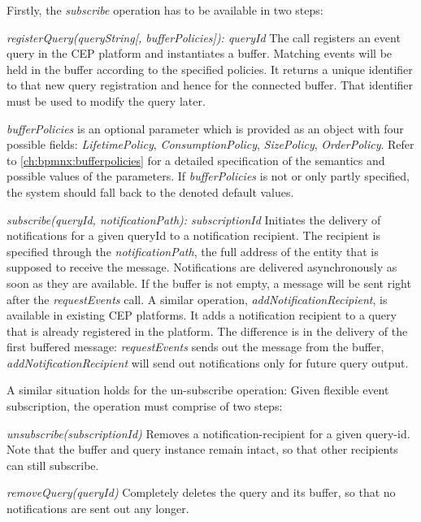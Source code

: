 Firstly, the \textit{subscribe} operation has to be available in two steps:

\begin{aenumerate}
	\item \textit{registerQuery(queryString[, bufferPolicies]): queryId}\newline
	The call registers an event query in the CEP platform and instantiates a buffer. Matching events will be held in the buffer according to the specified  policies. It returns a unique identifier to that new query registration and hence for the connected buffer. That identifier must be used to modify the query later.
	
	\textit{bufferPolicies} is an optional parameter which is provided as an object with four possible fields: \textit{LifetimePolicy}, \textit{ConsumptionPolicy}, \textit{SizePolicy}, \textit{OrderPolicy}. Refer to \autoref{ch:bpmnx:bufferpolicies} for a detailed specification of the semantics and possible values of the parameters. If \textit{bufferPolicies} is not or only partly specified, the system should fall back to the denoted default values.
	
	\item \textit{subscribe(queryId, notificationPath): subscriptionId}\newline
	Initiates the delivery of notifications for a given queryId to a notification recipient.
	The recipient is specified through the \textit{notificationPath}, the full address of the entity that is supposed to receive the message.
	Notifications are delivered asynchronously as soon as they are available. If the buffer is not empty, a message will be sent right after the \textit{requestEvents} call.
	A similar operation, \textit{addNotificationRecipient}, is available in existing CEP platforms. It adds a notification recipient to a query that is already registered in the platform. The difference is in the delivery of the first buffered message: \textit{requestEvents} sends out the message from the buffer, \textit{addNotificationRecipient} will send out notifications only for future query output.
\end{aenumerate}\label{def:apiextension-subscribe}

\noindent A similar situation holds for the un-subscribe operation: Given flexible event subscription, the operation must comprise of two steps:

\begin{aenumerate}
	\setcounter{enumi}{2}
	\item \textit{unsubscribe(subscriptionId)}\newline
	Removes a notification-recipient for a given query-id. Note that the buffer and query instance remain intact, so that other recipients can still subscribe.
	\item \textit{removeQuery(queryId)}\newline
	Completely deletes the query and its buffer, so that no notifications are sent out any longer. 
\end{aenumerate}\label{def:apiextension-unsubscribe}

